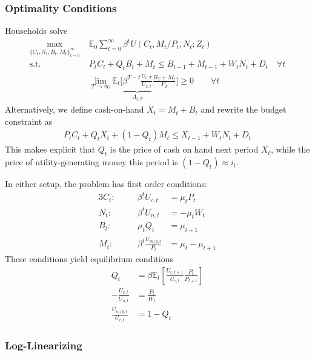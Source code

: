 \documentclass[12pt]{article}
\theoremstyle{plain}
\theoremstyle{definition}
\theoremstyle{remark}
\newcommand{\limT}{\lim_{T\rightarrow\infty}}
\newcommand{\E}{\mathbb{E}}
\newcommand{\sumtinfz}{\sum^\infty_{t=0}}
\newcommand{\tinfz}{^\infty_{t=0}}
\begin{document}
\subsubsection{Optimality Conditions}
Households solve
\begin{align*}
  \max_{\{C_t,N_t,B_t,M_t\}\tinfz} \;
  &\E_0\sumtinfz \beta^t U(C_t,M_t/P_t,N_t;Z_t) \\
  \text{s.t.}\quad&
  P_tC_t + Q_{t}B_t + M_t
  \leq B_{t-1} + M_{t-1} + W_tN_t + D_t\quad \forall t\\
  &\limT \E_t\bigg[
    \underbrace{\beta^{T-t} \frac{U_{c,T}}{U_{c,t}}}_{\Lambda_{t,T}}
    \frac{B_T+M_t}{P_T}
  \bigg]
  \geq 0
  \qquad \forall t
\end{align*}
Alternatively, we define cash-on-hand $X_t=M_t+B_t$ and rewrite the
budget constraint as
\begin{align*}
  P_tC_t
  + Q_{t}X_t
  + (1-Q_{t})M_t
  \leq X_{t-1} + W_tN_t + D_t
\end{align*}
This makes explicit that $Q_t$ is the price of cash on hand next period
$X_t$, while the price of utility-generating money this period is
$(1-Q_t)\approx i_t$.

In either setup, the problem has first order conditions:
\begin{alignat*}{3}
  C_t:&&\quad
  \beta^t U_{c,t} &= \mu_t P_t \\
  N_t:&&\quad
  \beta^t U_{n,t} &= -\mu_t W_t \\
  B_t:&&\quad
  \mu_t Q_t &= \mu_{t+1} \\
  M_t:&&\quad
  \beta^t \frac{U_{m/p,t}}{P_t}
  &=
  \mu_t - \mu_{t+1}
\end{alignat*}
These conditions yield equilibrium conditions
\begin{align*}
  Q_t &= \beta \E_t\left[
    \frac{U_{c,t+1}}{U_{c,t}}\frac{P_t}{P_{t+1}}
  \right]
  \\
  -\frac{U_{c,t}}{U_{n,t}} &= \frac{P_t}{W_t}
  \\
  \frac{U_{m/p,t}}{U_{c,t}}
  &=
  1 - Q_t
\end{align*}

\clearpage
\subsubsection{Log-Linearizing}
\end{document}

